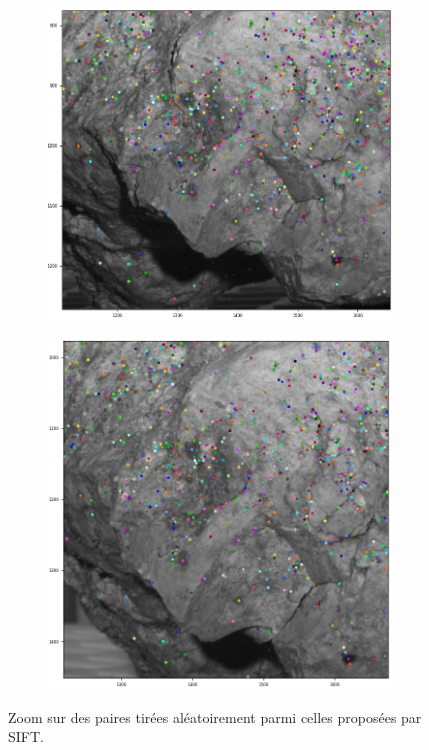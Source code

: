 \documentclass[
	a4paper, %
	10pt, %
	unnumberedsections, %
	twoside, %
]{LTJournalArticle}
\begin{document}
\begin{figure}[H]
	\centering
	\begin{subfigure}[H]{0.45\textwidth}
		\centering
		\includegraphics[width=\textwidth]{images/irl_sift_z1_g.png}
	\end{subfigure}
	\begin{subfigure}[H]{0.45\textwidth}
		\centering
		\includegraphics[width=\textwidth]{images/irl_sift_z1_d.png}
	\end{subfigure}
	\caption{Zoom sur des paires tirées aléatoirement parmi celles proposées par SIFT.}
	\label{figure:fig_irl_sift}
\end{figure}
\end{document}
